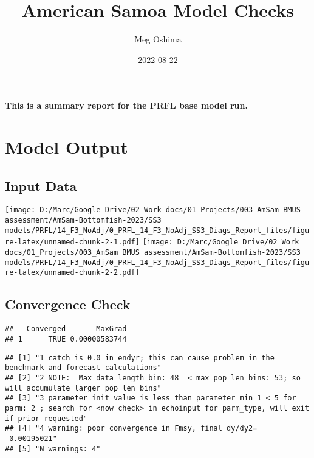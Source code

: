 \documentclass[
]{article}
\title{American Samoa Model Checks}
\author{Meg Oshima}
\date{2022-08-22}
\begin{document}
\maketitle

\textbf{This is a summary report for the PRFL base model run.}

\hypertarget{model-output}{%
\section{Model Output}\label{model-output}}

\hypertarget{input-data}{%
\subsection{Input Data}\label{input-data}}

\texttt{[image: D:/Marc/Google Drive/02\_Work docs/01\_Projects/003\_AmSam BMUS assessment/AmSam-Bottomfish-2023/SS3 models/PRFL/14\_F3\_NoAdj/0\_PRFL\_14\_F3\_NoAdj\_SS3\_Diags\_Report\_files/figure-latex/unnamed-chunk-2-1.pdf]}
\texttt{[image: D:/Marc/Google Drive/02\_Work docs/01\_Projects/003\_AmSam BMUS assessment/AmSam-Bottomfish-2023/SS3 models/PRFL/14\_F3\_NoAdj/0\_PRFL\_14\_F3\_NoAdj\_SS3\_Diags\_Report\_files/figure-latex/unnamed-chunk-2-2.pdf]}

\hypertarget{convergence-check}{%
\subsection{Convergence Check}\label{convergence-check}}

\begin{verbatim}
##   Converged       MaxGrad
## 1      TRUE 0.00000583744
\end{verbatim}

\begin{verbatim}
## [1] "1 catch is 0.0 in endyr; this can cause problem in the benchmark and forecast calculations"                                                           
## [2] "2 NOTE:  Max data length bin: 48  < max pop len bins: 53; so will accumulate larger pop len bins"                                                     
## [3] "3 parameter init value is less than parameter min 1 < 5 for parm: 2 ; search for <now check> in echoinput for parm_type, will exit if prior requested"
## [4] "4 warning: poor convergence in Fmsy, final dy/dy2= -0.00195021"                                                                                       
## [5] "N warnings: 4"
\end{verbatim}
\end{document}
